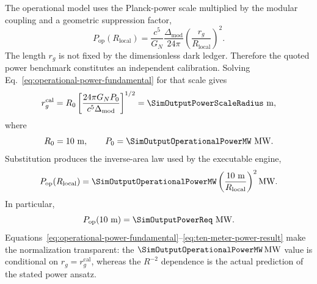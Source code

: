 The operational model uses the Planck-power scale multiplied by the modular
coupling and a geometric suppression factor,
\begin{equation}
  P_{\mathrm{op}}(R_{\mathrm{local}})
  =\frac{c^5}{G_N}
  \frac{\Delta_{\mathrm{mod}}}{24\pi}
  \left(\frac{r_g}{R_{\mathrm{local}}}\right)^2.
  \label{eq:operational-power-fundamental}
\end{equation}
The length \(r_g\) is not fixed by the dimensionless dark ledger.  Therefore
the quoted power benchmark constitutes an independent calibration.  Solving
Eq.~\eqref{eq:operational-power-fundamental} for that scale gives
\begin{equation}
  r_g^{\mathrm{cal}}
  =R_0
  \left[
    \frac{24\pi G_N P_0}
    {c^5\Delta_{\mathrm{mod}}}
  \right]^{1/2}
  =\SimOutputPowerScaleRadius\ \mathrm{m},
  \label{eq:calibrated-power-length}
\end{equation}
where
\begin{equation}
  R_0=10\ \mathrm{m},
  \qquad
  P_0=\SimOutputOperationalPowerMW\ \mathrm{MW}.
  \label{eq:power-benchmark-pair}
\end{equation}
Substitution produces the inverse-area law used by the executable engine,
\begin{equation}
  P_{\mathrm{op}}(R_{\mathrm{local}})
  =\SimOutputOperationalPowerMW
  \left(\frac{10\ \mathrm{m}}{R_{\mathrm{local}}}\right)^2
  \mathrm{MW}.
  \label{eq:operational-power-scaling}
\end{equation}
In particular,
\begin{equation}
  P_{\mathrm{op}}(10\ \mathrm{m})
  =\SimOutputPowerReq\ \mathrm{MW}.
  \label{eq:ten-meter-power-result}
\end{equation}
Equations~\eqref{eq:operational-power-fundamental}--\eqref{eq:ten-meter-power-result}
make the normalization transparent: the
\(\SimOutputOperationalPowerMW\,\mathrm{MW}\) value is conditional on
\(r_g=r_g^{\mathrm{cal}}\), whereas the \(R^{-2}\) dependence is the actual
prediction of the stated power ansatz.